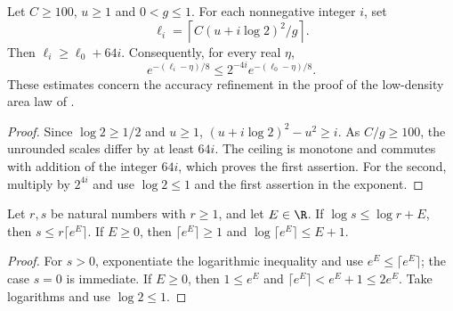 \begin{lemma}
    \label{lem:low_density_dyadic_residual}
    \leanok
    Let $C\ge100$, $u\ge1$ and $0<g\le1$. For each nonnegative integer $i$,
    set
    \[
        \ell_i=\left\lceil C(u+i\log2)^2/g\right\rceil.
    \]
    Then $\ell_i\ge\ell_0+64i$. Consequently, for every real $\eta$,
    \[
        e^{-(\ell_i-\eta)/8}
        \le 2^{-4i}e^{-(\ell_0-\eta)/8}.
    \]
    These estimates concern the accuracy refinement in the proof of the
    low-density area law of \cite{Arad2016RigorousRG}.
\end{lemma}
\begin{proof}\leanok
    Since $\log2\ge1/2$ and $u\ge1$,
    $(u+i\log2)^2-u^2\ge i$. As $C/g\ge100$, the unrounded scales differ
    by at least $64i$. The ceiling is monotone and commutes with addition
    of the integer $64i$, which proves the first assertion. For the second,
    multiply by $2^{4i}$ and use $\log2\le1$ and the first assertion
    in the exponent.
\end{proof}


\begin{lemma}
    \label{lem:logarithmic_rank_rounding}
    \leanok
    Let $r,s$ be natural numbers with $r\ge1$, and let $E\in\R$.
    If $\log s\le\log r+E$, then $s\le r\lceil e^E\rceil$.
    If $E\ge0$, then $\lceil e^E\rceil\ge1$ and
    $\log\lceil e^E\rceil\le E+1$.
\end{lemma}
\begin{proof}\leanok
    For $s>0$, exponentiate the logarithmic inequality and use
    $e^E\le\lceil e^E\rceil$; the case $s=0$ is immediate.
    If $E\ge0$, then $1\le e^E$ and
    $\lceil e^E\rceil<e^E+1\le2e^E$. Take logarithms and use
    $\log2\le1$.
\end{proof}
